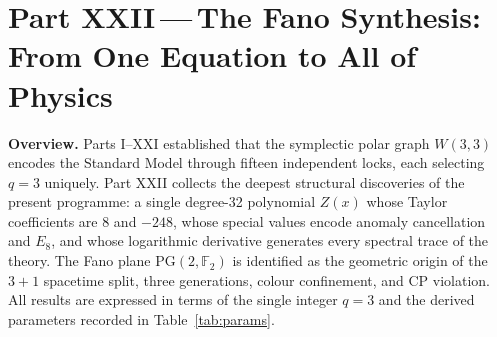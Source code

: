\par\noindent{}\par\medskip


\part*{Part XXII\,---\,The Fano Synthesis: From One Equation to All of Physics}

\bigskip

\noindent\textbf{Overview.}\;
Parts I--XXI established that the symplectic polar graph $W(3,3)$
encodes the Standard Model through fifteen independent locks, each
selecting $q=3$ uniquely.  Part XXII collects the deepest structural
discoveries of the present programme: a single degree-32 polynomial
$Z(x)$ whose Taylor coefficients are $8$ and $-248$, whose special
values encode anomaly cancellation and $E_8$, and whose logarithmic
derivative generates every spectral trace of the theory.  The Fano plane
$\mathrm{PG}(2,\mathbb{F}_2)$ is identified as the geometric origin of
the $3+1$ spacetime split, three generations, colour confinement, and
CP violation.  All results are expressed in terms of the single integer
$q=3$ and the derived parameters recorded in Table~\ref{tab:params}.

